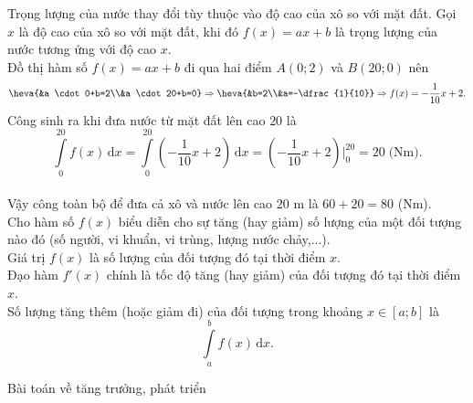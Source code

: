\begin{vd}
{		Trọng lượng của nước thay đổi tùy thuộc vào độ cao của xô so với mặt đất. Gọi $x$ là độ cao của xô so với mặt đất, khi đó $ f(x)=ax+b$ là trọng lượng của nước tương ứng với độ cao $x$.\\
		Đồ thị hàm số $f(x)=ax+b$ đi qua hai điểm $A(0;2)$ và $B(20;0)$ nên
		\[\heva{&a \cdot 0+b=2\\&a \cdot 20+b=0}\Rightarrow \heva{&b=2\\&a=-\dfrac{1}{10}}\Rightarrow f(x)=-\dfrac{1}{10}x+2.\] 
		Công sinh ra khi đưa nước từ mặt đất lên cao $20$ là 
		\[\displaystyle\int\limits_0^{20} f(x)\mathrm{\,d}x=\displaystyle\int\limits_0^{20}\left(-\dfrac{1}{10}x+2\right) \mathrm{\,d}x=\left(-\dfrac{1}{10}x+2\right)\bigg|_{0}^{20}=20\;\text{(Nm)}.\]\\
		Vậy công toàn bộ để đưa cả xô và nước lên cao $20$ m là $60+20=80$ (Nm).\\
		Cho hàm số $f(x)$ biểu diễn cho sự tăng (hay giảm) số lượng của một đối tượng nào đó (số người, vi khuẩn, vi trùng, lượng nước chảy,...).\\
		Giá trị $f(x)$ là số lượng của đối tượng đó tại thời điểm $x$.\\
		Đạo hàm $f'(x)$ chính là tốc độ tăng (hay giảm) của đối tượng đó tại thời điểm $x$.\\
		Số lượng tăng thêm (hoặc giảm đi) của đối tượng trong khoảng $x\in \left[a;b\right]$ là
		\[\displaystyle\int\limits_a^b f(x)\mathrm{\,d}x.\]}
\end{vd}
\begin{dang}{Bài toán về tăng trưởng, phát triển}
\end{dang}
